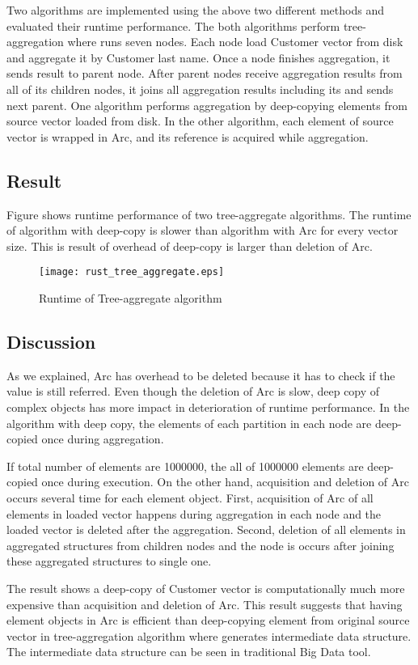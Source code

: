 Two algorithms are implemented using the above two different methods and evaluated their runtime performance. 
The both algorithms perform tree-aggregation where runs seven nodes. 
Each node load Customer vector from disk and aggregate it by Customer last name. Once a node finishes aggregation, it sends result to parent node. 
After parent nodes receive aggregation results from all of its children nodes, it joins all aggregation results including its and sends next parent. 
One algorithm performs aggregation by deep-copying elements from source vector loaded from disk. In the other algorithm, each element of source vector 
is wrapped in Arc, and its reference is acquired while aggregation. 


\subsection{Result}

Figure shows runtime performance of two tree-aggregate algorithms. The runtime of algorithm with deep-copy is slower than algorithm with Arc for every vector size. 
This is result of overhead of deep-copy is larger than deletion of Arc. 

\begin{figure}[htb]
    \texttt{[image: rust\_tree\_aggregate.eps]}
    \caption{Runtime of Tree-aggregate algorithm}
    \label{fig:Sampling}
\end{figure}

\subsection{Discussion}
As we explained, Arc has overhead to be deleted because it has to check if the value is still referred. 
Even though the deletion of Arc is slow, deep copy of complex objects has more impact in deterioration of runtime performance. 
In the algorithm with deep copy, the elements of each partition in each node are deep-copied once during aggregation. 

If total number of elements are 1000000, the all of 1000000 elements are deep-copied once during execution. On the other hand, acquisition and deletion of Arc occurs several time for each element object.
First, acquisition of Arc of all elements in loaded vector happens during aggregation in each node and the loaded vector is deleted after the aggregation. 
Second, deletion of all elements in aggregated structures from children nodes and the node is occurs after joining these aggregated structures to single one. 

The result shows a deep-copy of Customer vector is computationally much more expensive than acquisition and deletion of Arc. 
This result suggests that having element objects in Arc is efficient than deep-copying element from original source vector in tree-aggregation algorithm 
where generates intermediate data structure. The intermediate data structure can be seen in traditional Big Data tool.